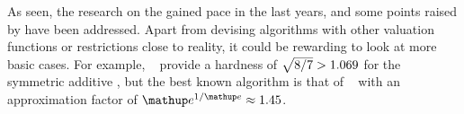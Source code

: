As seen, the research on the \NSW{} gained pace in the last years, and some points raised by \citeauthor{APNSWuSVþUM} have been addressed.
Apart from devising algorithms with other valuation functions or restrictions close to reality, it could be rewarding to look at more basic cases.
For example, \citeauthor{satiation_in_fisher_markets_and_approx_of_nsw}~\cite{satiation_in_fisher_markets_and_approx_of_nsw} provide a hardness of \(\smash{\sqrt{8/7}} > 1.069\) for the symmetric additive \NSW, but the best known algorithm is that of \citeauthor{finding_fair_and_efficient_allocs}~\cite{finding_fair_and_efficient_allocs} with an approximation factor of \(\euler^{1/\euler} \approx 1.45\).





